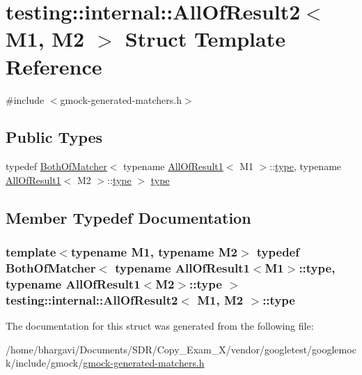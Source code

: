 \hypertarget{structtesting_1_1internal_1_1_all_of_result2}{}\section{testing\+:\+:internal\+:\+:All\+Of\+Result2$<$ M1, M2 $>$ Struct Template Reference}
\label{structtesting_1_1internal_1_1_all_of_result2}


{\ttfamily \#include $<$gmock-\/generated-\/matchers.\+h$>$}

\subsection*{Public Types}
\begin{DoxyCompactItemize}
\item 
typedef \hyperlink{classtesting_1_1internal_1_1_both_of_matcher}{Both\+Of\+Matcher}$<$ typename \hyperlink{structtesting_1_1internal_1_1_all_of_result1}{All\+Of\+Result1}$<$ M1 $>$\+::\hyperlink{structtesting_1_1internal_1_1_all_of_result2_adec0b0ce2fdd07d398e1fdd2cdb88392}{type}, typename \hyperlink{structtesting_1_1internal_1_1_all_of_result1}{All\+Of\+Result1}$<$ M2 $>$\+::\hyperlink{structtesting_1_1internal_1_1_all_of_result2_adec0b0ce2fdd07d398e1fdd2cdb88392}{type} $>$ \hyperlink{structtesting_1_1internal_1_1_all_of_result2_adec0b0ce2fdd07d398e1fdd2cdb88392}{type}
\end{DoxyCompactItemize}


\subsection{Member Typedef Documentation}
\subsubsection[{\texorpdfstring{type}{type}}]{\setlength{\rightskip}{0pt plus 5cm}template$<$typename M1, typename M2$>$ typedef {\bf Both\+Of\+Matcher}$<$ typename {\bf All\+Of\+Result1}$<$M1$>$\+::{\bf type}, typename {\bf All\+Of\+Result1}$<$M2$>$\+::{\bf type} $>$ {\bf testing\+::internal\+::\+All\+Of\+Result2}$<$ M1, M2 $>$\+::{\bf type}}\hypertarget{structtesting_1_1internal_1_1_all_of_result2_adec0b0ce2fdd07d398e1fdd2cdb88392}{}\label{structtesting_1_1internal_1_1_all_of_result2_adec0b0ce2fdd07d398e1fdd2cdb88392}


The documentation for this struct was generated from the following file\+:\begin{DoxyCompactItemize}
\item 
/home/bhargavi/\+Documents/\+S\+D\+R/\+Copy\+\_\+\+Exam\+\_\+X/vendor/googletest/googlemock/include/gmock/\hyperlink{gmock-generated-matchers_8h}{gmock-\/generated-\/matchers.\+h}\end{DoxyCompactItemize}

